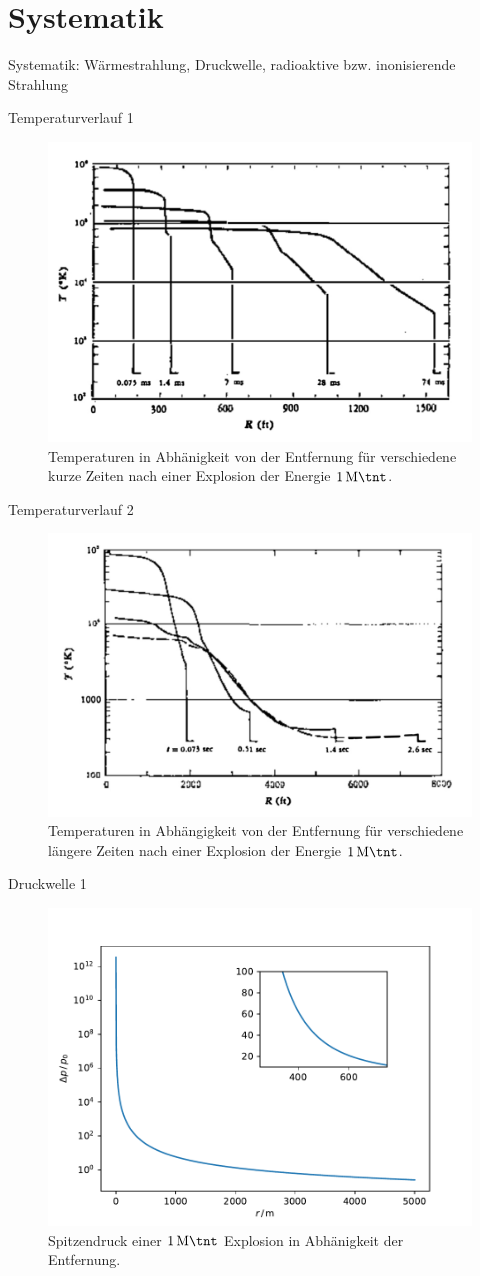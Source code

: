 \section{Systematik}
\begin{frame}
	\begin{block}{Systematik: Wärmestrahlung, Druckwelle, radioaktive bzw. inonisierende Strahlung}
	\end{block}
\end{frame}
\begin{frame}{Temperaturverlauf 1}
\begin{figure}
	\centering
	\includegraphics[width=0.5\linewidth]{img/img1}
	\caption{Temperaturen in Abhänigkeit von der Entfernung für verschiedene kurze Zeiten nach einer Explosion der Energie $\SI{1}{\mega \tnt}$.\cite{AnnuRev18_1}}
\end{figure}
\end{frame}
\begin{frame}{Temperaturverlauf 2}
	\begin{figure}
		\centering
		\includegraphics[width=0.5\linewidth]{img/img3.jpg}
		\caption{Temperaturen in Abhängigkeit von der Entfernung für verschiedene längere Zeiten nach einer Explosion der Energie $\SI{1}{\mega \tnt}$.\cite{AnnuRev18_1}}
	\end{figure}
\end{frame}
\begin{frame}{Druckwelle 1}
	\begin{figure}
		\includegraphics[width=0.5\linewidth]{img/over.pdf}
		\caption{Spitzendruck einer $\SI{1}{\mega \tnt}$ Explosion in Abhänigkeit der Entfernung.}
	\end{figure}
\end{frame}
